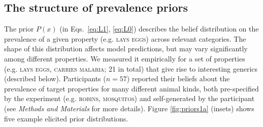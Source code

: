 \documentclass{pnastwo}
\begin{document}
\begin{article}
\subsection{The structure of prevalence priors}




 The prior $P(x)$ (in Eqs.~\ref{eq:L1}, \ref{eq:L0}) describes the belief distribution on the prevalence of a given property (e.g. \textsc{lays eggs}) across relevant categories. 
The shape of this distribution affects model predictions, but may vary significantly among different properties.
 We measured it empirically for a set of properties (e.g. \textsc{lays eggs, carries malaria}; 21 in total) that give rise to interesting generics (described below). 
 Participants ($n=57$) reported their beliefs about the prevalence of target properties for many different animal kinds, both pre-specified by the experiment (e.g. \textsc{robins, mosquitos}) and self-generated by the participant (see \emph{Methods and Materials} for more details).
 Figure \ref{fig:priors1a} (insets) shows five example elicited prior distributions.






\end{article}
\end{document}
